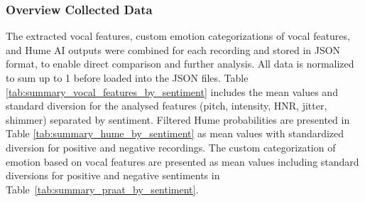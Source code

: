 \subsubsection{Overview Collected Data}
The extracted vocal features, custom emotion categorizations of vocal features, and Hume AI outputs were combined for each recording and stored in JSON format, to enable direct comparison and further analysis. All data is normalized to sum up to 1 before loaded into the JSON files. 
Table \ref{tab:summary_vocal_features_by_sentiment} includes the mean values and standard diversion for the analysed features (pitch, intensity, HNR, jitter, shimmer) separated by sentiment. 
Filtered Hume probabilities are presented in Table \ref{tab:summary_hume_by_sentiment} as mean values with standardized diversion for positive and negative recordings.
The custom categorization of emotion based on vocal features are presented as mean values including standard diversions for positive and negative sentiments in Table~\ref{tab:summary_praat_by_sentiment}. 

